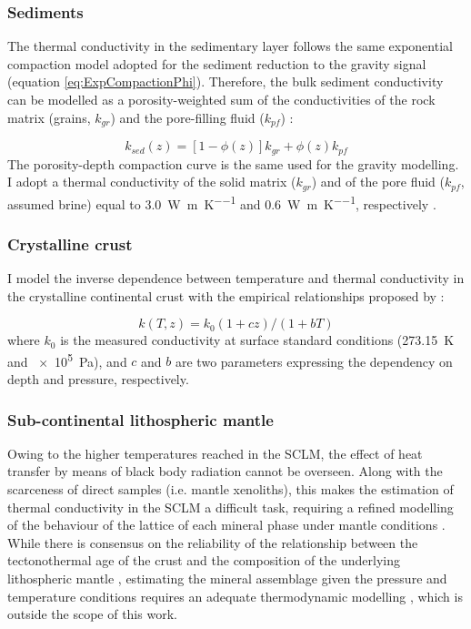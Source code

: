 \subsubsection{Sediments}
\label{sss:Appl:ThermCondSed}
The thermal conductivity in the sedimentary layer follows the same exponential compaction model adopted for the sediment reduction to the gravity signal (equation \ref{eq:ExpCompactionPhi}). Therefore, the bulk sediment conductivity can be modelled as a porosity-weighted sum of the conductivities of the rock matrix (grains, $k_{gr}$) and the pore-filling fluid ($k_{pf}$) \parencites{woodside1961}{allen2013basin}:

\begin{equation}
\label{eq:kSED}
k_{sed}(z) = [1-\phi(z)] k_{gr}+ \phi(z) k_{pf}
\end{equation}
The porosity-depth compaction curve is the same used for the gravity modelling.
I adopt a thermal conductivity of the solid matrix ($k_{gr}$) and of the pore fluid ($k_{pf}$, assumed brine) equal to \SI{3.0}{\watt \per \metre \per \kelvin} and \SI{0.6}{\watt \per \metre \per \kelvin}, respectively \parencite{Revil2000}.

\subsubsection{Crystalline crust}
\label{sss:Appl:ThermCondCrust}
I model the inverse dependence between temperature and thermal conductivity in the crystalline continental crust with the empirical relationships proposed by \textcite{Chapman1986}:

\begin{equation}
\label{eq:kTzChap86}
k(T,z) = k_0 (1+cz) / (1+bT)
\end{equation}
where $k_0$ is the measured conductivity at surface standard conditions (\SI{273.15}{\kelvin} and \SI{e5}{\pascal}), and $c$ and $b$ are two parameters expressing the dependency on depth and pressure, respectively.

\subsubsection{Sub-continental lithospheric mantle}
\label{sss:Appl:ThermCondSCLM}
Owing to the higher temperatures reached in the SCLM, the effect of heat transfer by means of black body radiation cannot be overseen.
Along with the scarceness of direct samples (i.e. mantle xenoliths), this makes the estimation of thermal conductivity in the SCLM a difficult task, requiring a refined modelling of the behaviour of the lattice of each mineral phase under mantle conditions \parencite{Hofmeister1999}.
While there is consensus on the reliability of the relationship between the tectonothermal age of the crust and the composition of the underlying lithospheric mantle \parencites{Afonso2008}{Griffin2009}, estimating the mineral assemblage given the pressure and temperature conditions requires an adequate thermodynamic modelling \parencite[e.g][]{Guerri2015}, which is outside the scope of this work.

